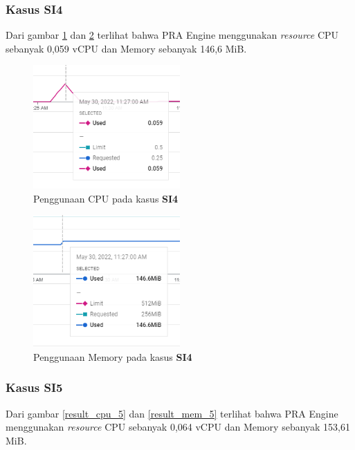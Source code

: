 \pagebreak

\subsubsection{Kasus SI4}
Dari gambar \ref{result_cpu_4} dan \ref{result_mem_4} terlihat bahwa PRA Engine menggunakan \textit{resource} CPU sebanyak 0,059 vCPU dan Memory sebanyak 146,6 MiB. 

\begin{figure}[!htb]
	\centering
	\includegraphics[width=0.5\textwidth]{resources/ch4/resource/4-cpu.png}
	\caption{Penggunaan CPU pada kasus \textbf{SI4}}
	\label{result_cpu_4}
\end{figure}

\begin{figure}[!htb]
	\centering
	\includegraphics[width=0.5\textwidth]{resources/ch4/resource/4-mem.png}
	\caption{Penggunaan Memory pada kasus \textbf{SI4}}
	\label{result_mem_4}
\end{figure}

\pagebreak

\subsubsection{Kasus SI5}
Dari gambar \ref{result_cpu_5} dan \ref{result_mem_5} terlihat bahwa PRA Engine menggunakan \textit{resource} CPU sebanyak 0,064 vCPU dan Memory sebanyak 153,61 MiB. 

